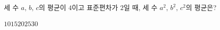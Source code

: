 세 수 $a$, $b$, $c$의 평균이 $4$이고 표준편차가 $2$일 때, 세 수 $a^2$, $b^2$, $c^2$의 평균은?
\begin{choices32}{$10$}{$15$}{$20$}{$25$}{$30$}\end{choices32}
